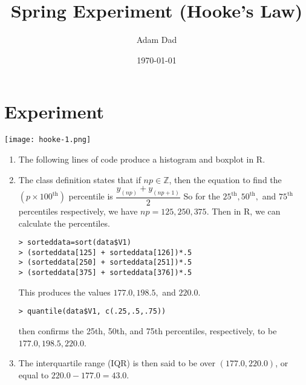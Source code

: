 \documentclass[a4paper]{article}
\title{Spring Experiment (Hooke's Law)}
\author{Adam Dad}
\date{\today}
\begin{document}
\maketitle

\section*{Experiment}
\begin{center}
\texttt{[image: hooke-1.png]}\\
\end{center}

\begin{enumerate}[label=(\alph*)]
\item The following lines of code produce a histogram and boxplot in R.



\item The class definition states that if $np\in\mathbb{Z}$, then the equation to find the $(p\times 100^{\text{th}})$ percentile is $\dfrac{y_{(np)}+y_{(np+1)}}{2}$ So for the $25^{\text{th}},50^{\text{th}},$ and $75^{\text{th}}$ percentiles respectively, we have $np=125, 250,375$. Then in R, we can calculate the percentiles.
\begin{verbatim}
> sorteddata=sort(data$V1)
> (sorteddata[125] + sorteddata[126])*.5
> (sorteddata[250] + sorteddata[251])*.5
> (sorteddata[375] + sorteddata[376])*.5
\end{verbatim}
This produces the values $177.0,198.5,$ and $220.0$.
\begin{verbatim}
> quantile(data$V1, c(.25,.5,.75))
\end{verbatim}
then confirms the 25th, 50th, and 75th percentiles, respectively, to be $177.0, 198.5, 220.0$. 

\item The interquartile range (IQR) is then said to be over $(177.0,220.0)$, or equal to $220.0-177.0=43.0$. 


\end{enumerate}
\end{document}
